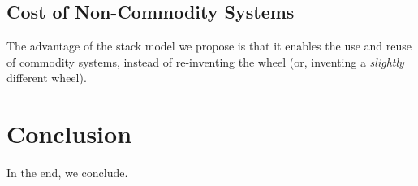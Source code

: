 \documentclass{acm_proc_article-sp}
\begin{document}
\subsection{Cost of Non-Commodity Systems}
\label{sec:commodity}

The advantage of the stack model we propose is that it enables the use and reuse of commodity
systems, instead of re-inventing the wheel (or, inventing a \emph{slightly} different wheel).

\section{Conclusion}
\label{sec:conclusion}

In the end, we conclude.

\appendix


 

\end{document}
